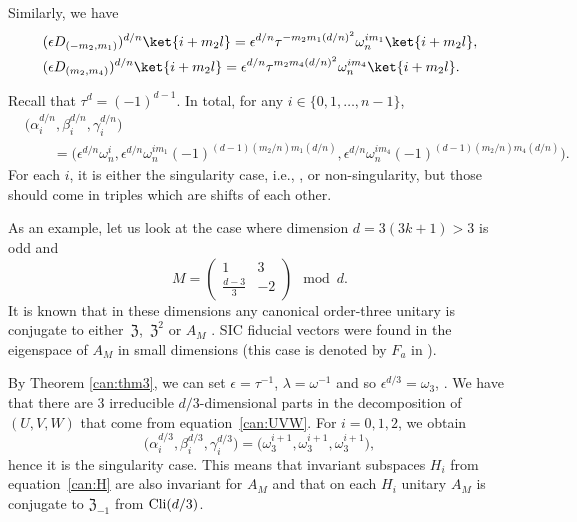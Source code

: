 \documentclass[pdftex]{sigma}
\numberwithin{equation}{section}
\newcommand{\bmp}{\begin{pmatrix}}
\newcommand{\emp}{\end{pmatrix}}
\begin{document}
Similarly, we have
\begin{align*}
 & (\epsilon D_{(-m_2,m_1)})^{d/n}\ket{i+m_2 l}
 = \epsilon^{d/n}\tau^{-m_2m_1(d/n)^2}\omega_n^{im_1}\ket{i+m_2 l}, \\
 & (\epsilon D_{(m_2,m_4)})^{d/n}\ket{i+m_2 l}
 = \epsilon^{d/n}\tau^{m_2m_4(d/n)^2}\omega_n^{im_4}\ket{i+m_2 l}.
\end{align*}

Recall that $\tau^d = (-1)^{d-1}$. In total, for any $i \in \{0,1,\dots, n-1\}$,
\begin{align*}
 & \bigl(\alpha_i^{d/n}, \beta_i^{d/n}, \gamma_i^{d/n}\bigr) \\
 &\qquad= \bigl(\epsilon^{d/n}\omega_n^{i},
 \epsilon^{d/n}\omega_n^{im_1}(-1)^{(d-1)(m_2/n)m_1(d/n)},
 \epsilon^{d/n}\omega_n^{im_4}(-1)^{(d-1)(m_2/n)m_4(d/n)}\bigr).
\end{align*}
For each $i$, it is either the singularity case, i.e.,
,
or non-singularity, but those should come in triples which are
shifts of each other.

As an example, let us look at the case where dimension $d=3(3k+1)>3$ is odd and
\[
 M = \bmp 1 & 3 \\ \frac{d-3}{3} & -2 \emp \mod d.
\]
It is known that in these dimensions any canonical order-three unitary is
conjugate to either~$\mathfrak{Z}$,~$\mathfrak{Z}^2$ or $A_M$ \cite{BosWal}.
SIC fiducial vectors were found in the eigenspace of $A_M$ in small dimensions
(this case is denoted by $F_a$ in \cite{SG}).

By Theorem \ref{can:thm3}, we can set $\epsilon = \tau^{-1}$,
$\lambda = \omega^{-1}$ and so $\epsilon^{d/3} = \omega_3$,
.
We have that there are $3$ irreducible $d/3$-dimensional parts
in the decomposition of $(U,V,W)$ that come from equation~\eqref{can:UVW}.
For $i=0,1,2$, we obtain
\[
 \bigl(\alpha_i^{d/3}, \beta_i^{d/3}, \gamma_i^{d/3}\bigr) =
 \bigl(\omega_3^{i+1},
 \omega_3^{i+1},
 \omega_3^{i+1}\bigr),
\]
hence it is the singularity case. This means that invariant subspaces
$H_i$ from equation~\eqref{can:H} are also invariant for $A_M$
and that on each $H_i$ unitary $A_M$ is
conjugate to $\mathfrak{Z}_{-1}$ from ${\rm Cli}(d/3)$.
\end{document}
